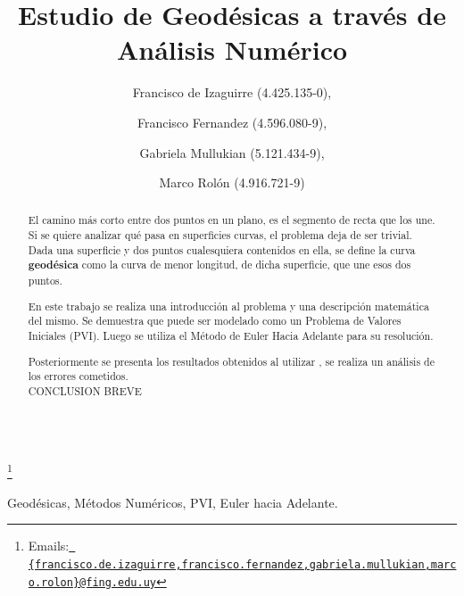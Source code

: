 \documentclass{endm}
\begin{document}
\begin{verbatim}\end{verbatim}\vspace{2.5cm}

\begin{frontmatter}

\title{Estudio de Geod\'esicas a trav\'es de An\'alisis Num\'erico}

\author{Francisco de Izaguirre (4.425.135-0),}
\author{Francisco Fernandez (4.596.080-9),}
\author{Gabriela Mullukian (5.121.434-9),}
\author{Marco Rol\'on (4.916.721-9)}

\address{Instituto de Matem\'atica y Estad\'istica\\ Facultad de Ingenier\'ia. Universidad de la Rep\'ublica\\ Montevideo, Uruguay}

\thanks[mails]{Emails:\href{} {\texttt{\normalshape
   \{francisco.de.izaguirre,francisco.fernandez,gabriela.mullukian,marco.rolon\}@fing.edu.uy}}}

\begin{abstract}
\tab El camino m\'as corto entre dos puntos en un plano, es el segmento de recta que los une. Si se quiere analizar qu\'e pasa en superficies curvas, el problema deja de ser trivial. Dada una superficie y dos puntos cualesquiera contenidos en ella, se define la curva \textbf{geod\'esica} como la curva de menor longitud, de dicha superficie, que une esos dos puntos.
    
En este trabajo se realiza una introducci\'on al problema y una descripci\'on matem\'atica del mismo. Se demuestra que puede ser modelado como un Problema de Valores Iniciales (PVI). Luego se utiliza el M\'etodo de Euler Hacia Adelante para su resoluci\'on.


Posteriormente se presenta los resultados obtenidos al utilizar , se realiza un an\'alisis de los errores cometidos. \\ CONCLUSION BREVE
     
\end{abstract}
\begin{keyword}
Geod\'esicas, M\'etodos Num\'ericos, PVI, Euler hacia Adelante.
\end{keyword}

\end{frontmatter}
\newpage
\end{document}
